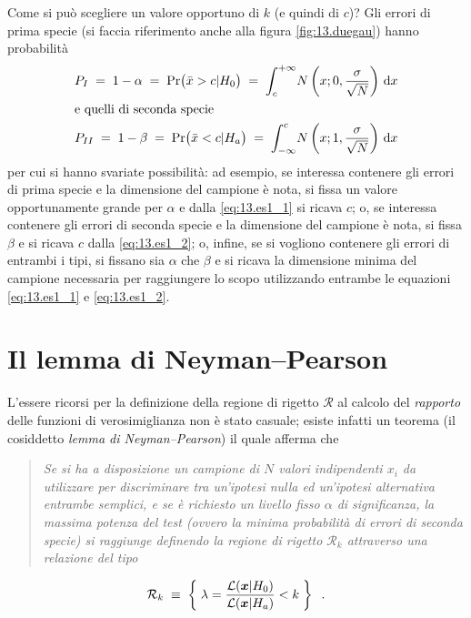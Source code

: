 Come si pu\`o scegliere un valore opportuno di $k$ (e quindi
di $c$)?  Gli errori di prima specie (si faccia riferimento
anche alla figura \ref{fig:13.duegau}) hanno probabilit\`a
\begin{gather}
  P_I \; = \; 1 - \alpha \; = \; \Pr \bigl( \bar x > c | H_0
    \bigr) \; = \; \int_c^{+\infty} \! N \left( x; 0,
    \frac{\sigma}{\sqrt{N}} \right) \, \mathrm{d} x
    \label{eq:13.es1_1} \\
  \intertext{e quelli di seconda specie}
  P_{II} \; = \; 1 - \beta \; = \; \Pr \bigl( \bar x < c | H_a
    \bigr) \; = \; \int_{-\infty}^c \! N \left( x; 1,
    \frac{\sigma}{\sqrt{N}} \right) \, \mathrm{d} x
    \label{eq:13.es1_2}
\end{gather}
per cui si hanno svariate possibilit\`a: ad esempio, se
interessa contenere gli errori di prima specie e la
dimensione del campione \`e nota, si fissa un valore
opportunamente grande per $\alpha$ e dalla
\eqref{eq:13.es1_1} si ricava $c$; o, se interessa contenere
gli errori di seconda specie e la dimensione del campione
\`e nota, si fissa $\beta$ e si ricava $c$ dalla
\eqref{eq:13.es1_2}; o, infine, se si vogliono contenere gli
errori di entrambi i tipi, si fissano sia $\alpha$ che
$\beta$ e si ricava la dimensione minima del campione
necessaria per raggiungere lo scopo utilizzando entrambe le
equazioni \eqref{eq:13.es1_1} e \eqref{eq:13.es1_2}.

\section{Il lemma di Neyman--Pearson}%
L'essere ricorsi per la definizione della regione di rigetto
$\mathcal{R}$ al calcolo del \emph{rapporto} delle funzioni
di verosimiglianza non \`e stato casuale; esiste infatti un
teorema (il cosiddetto \emph{lemma di Neyman--Pearson}) il
quale afferma che
\begin{quote}
  \textit{Se si ha a disposizione un campione di $N$ valori
    indipendenti $x_i$ da utilizzare per discriminare tra
    un'ipotesi nulla ed un'ipotesi alternativa entrambe
    semplici, e se \`e richiesto un livello fisso $\alpha$
    di significanza, la massima potenza del test (ovvero la
    minima probabilit\`a di errori di seconda specie) si
    raggiunge definendo la regione di rigetto
    $\mathcal{R}_k$ attraverso una relazione del tipo}
\end{quote}
\begin{equation} \label{eq:13.lambdak}
  \mathcal{R}_k \; \equiv \; \left\{ \; \lambda =
    \frac{\mathcal{L} (\boldsymbol{x} | H_0)}{\mathcal{L}
    (\boldsymbol{x} | H_a)} < k \; \right\} \;\; .
\end{equation}

